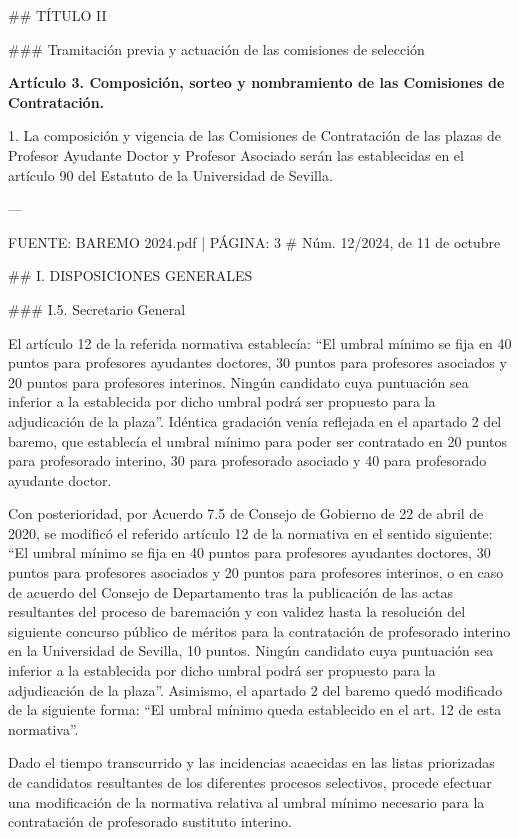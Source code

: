 \documentclass{article}
\begin{document}
\begin{itemize}
\begin{itemize}
\begin{scriptsize}
                  \#\# TÍTULO II

                  \#\#\# Tramitación previa y actuación de las comisiones de selección

                  \textbf{Artículo 3. Composición, sorteo y nombramiento de las Comisiones de Contratación.}

                  1. La composición y vigencia de las Comisiones de Contratación de las plazas de Profesor Ayudante Doctor y Profesor Asociado serán las establecidas en el artículo 90 del Estatuto de la Universidad de Sevilla.

                  ---

                  FUENTE: BAREMO 2024.pdf | PÁGINA: 3
                  \# Núm. 12/2024, de 11 de octubre

                  \#\# I. DISPOSICIONES GENERALES

                  \#\#\# I.5. Secretario General

                  El artículo 12 de la referida normativa establecía: “El umbral mínimo se fija en 40 puntos para profesores ayudantes doctores, 30 puntos para profesores asociados y 20 puntos para profesores interinos. Ningún candidato cuya puntuación sea inferior a la establecida por dicho umbral podrá ser propuesto para la adjudicación de la plaza”. Idéntica gradación venía reflejada en el apartado 2 del baremo, que establecía el umbral mínimo para poder ser contratado en 20 puntos para profesorado interino, 30 para profesorado asociado y 40 para profesorado ayudante doctor.

                  Con posterioridad, por Acuerdo 7.5 de Consejo de Gobierno de 22 de abril de 2020, se modificó el referido artículo 12 de la normativa en el sentido siguiente: “El umbral mínimo se fija en 40 puntos para profesores ayudantes doctores, 30 puntos para profesores asociados y 20 puntos para profesores interinos, o en caso de acuerdo del Consejo de Departamento tras la publicación de las actas resultantes del proceso de baremación y con validez hasta la resolución del siguiente concurso público de méritos para la contratación de profesorado interino en la Universidad de Sevilla, 10 puntos. Ningún candidato cuya puntuación sea inferior a la establecida por dicho umbral podrá ser propuesto para la adjudicación de la plaza”. Asimismo, el apartado 2 del baremo quedó modificado de la siguiente forma: “El umbral mínimo queda establecido en el art. 12 de esta normativa”.

                  Dado el tiempo transcurrido y las incidencias acaecidas en las listas priorizadas de candidatos resultantes de los diferentes procesos selectivos, procede efectuar una modificación de la normativa relativa al umbral mínimo necesario para la contratación de profesorado sustituto interino.


\end{scriptsize}
\end{itemize}
\end{itemize}
\end{document}
